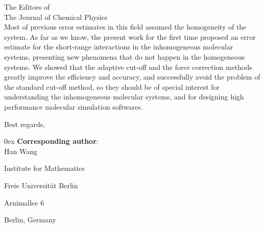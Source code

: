 \documentclass{letter}
\begin{document}
\begin{letter}{
    The Editors of\\
    The Journal of Chemical Physics\\
  }
Most of previous error estimates in this field assumed the homogeneity
of the system. As far as we know, the present work for the first time
proposed an error estimate for the short-range interactions in the
inhomogeneous molecular systems, presenting new phenomena that do not
happen in the homogeneous systems.  We showed that the adaptive cut-off
and the force correction methods greatly improve the efficiency and
accuracy, and successfully avoid the problem of the standard cut-off
method, so they should be of special interest for
understanding the inhomogeneous molecular systems, and for
designing high
performance molecular simulation softwares.
\\
\vskip 1cm

\closing{Best regards,}

\vskip 1cm
\parindent0ex \textbf{Corresponding author}:\\

\qquad Han Wang

\qquad Institute for Mathematics

\qquad Freie Universit\"at Berlin

\qquad Arnimallee 6

 Berlin, Germany

 \\




\end{letter} 
\end{document}
